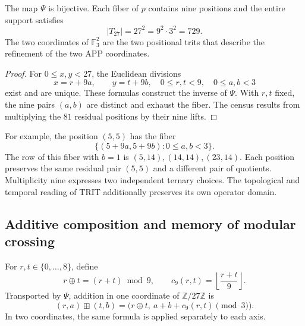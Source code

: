\begin{proposition}
\label{prop:app-refinamiento-fibras}
The map $\Psi$ is bijective. Each fiber of $p$ contains nine
positions and the entire support satisfies
\[
 |T_{27}|=27^2=9^2\cdot3^2=729.
\]
The two coordinates of $\mathbb F_3^2$ are the two positional trits
that describe the refinement of the two APP coordinates.
\end{proposition}
\begin{proof}
For $0\leq x,y<27$, the Euclidean divisions
\[
 x=r+9a,\qquad y=t+9b,
 \quad 0\leq r,t<9,\quad0\leq a,b<3
\]
exist and are unique. These formulas construct the inverse of $\Psi$.
With $r,t$ fixed, the nine pairs $(a,b)$ are distinct and exhaust the
fiber. The census results from multiplying the $81$ residual positions
by their nine lifts.
\end{proof}

For example, the position $(5,5)$ has the fiber
\[
 \{(5+9a,5+9b):0\leq a,b<3\}.
\]
The row of this fiber with $b=1$ is
$(5,14),(14,14),(23,14)$. Each position preserves the same residual pair
$(5,5)$ and a different pair of quotients. Multiplicity nine expresses
two independent ternary choices. The topological and
temporal reading of TRIT additionally preserves its own operator domain.

\subsection{Additive composition and memory of modular crossing}

For $r,t\in\{0,\ldots,8\}$, define
\[
 r\oplus t=(r+t)\bmod9,\qquad
 c_9(r,t)=\left\lfloor\frac{r+t}{9}\right\rfloor.
\]
Transported by $\Psi$, addition in one coordinate of
$\mathbb Z/27\mathbb Z$ is
\begin{equation}
 (r,a)\boxplus(t,b)
   =\bigl(r\oplus t,\ a+b+c_9(r,t)\pmod3\bigr).
 \label{eq:app-refinamiento-adicion}
\end{equation}
In two coordinates, the same formula is applied separately to each axis.

